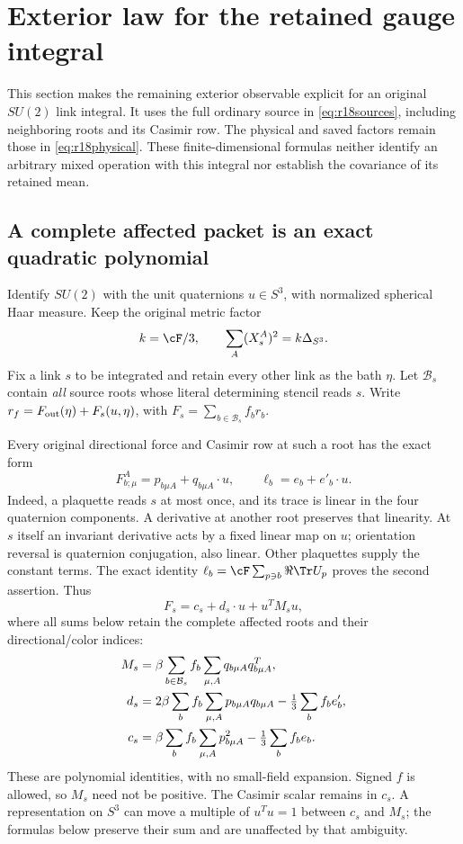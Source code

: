 \section{Exterior law for the retained gauge integral}
\label{bp:section}

This section makes the remaining exterior observable explicit for an original $SU(2)$ link integral. It uses the full ordinary source in \eqref{eq:r18sources}, including neighboring roots and its Casimir row. The physical and saved factors remain those in \eqref{eq:r18physical}. These finite-dimensional formulas neither identify an arbitrary mixed operation with this integral nor establish the covariance of its retained mean.

\subsection{A complete affected packet is an exact quadratic polynomial}

Identify $SU(2)$ with the unit quaternions $u\in S^3$, with normalized spherical Haar measure. Keep the original metric factor
\[
 k=\cF/3,\qquad \sum_A(X_s^A)^2=k\Delta_{S^3}.
\]
Fix a link $s$ to be integrated and retain every other link as the bath $\eta$. Let $\mathcal B_s$ contain \emph{all} source roots whose literal determining stencil reads $s$. Write
$r_f=F_{\rm out}(\eta)+F_s(u,\eta)$, with $F_s=\sum_{b\in\mathcal B_s}f_br_b$.

Every original directional force and Casimir row at such a root has the exact form
\begin{equation}
 F_{b;\mu}^A=p_{b\mu A}+q_{b\mu A}\cdot u,
 \qquad \ell_b=e_b+e'_b\cdot u.
 \label{bp:affineforces}
\end{equation}
Indeed, a plaquette reads $s$ at most once, and its trace is linear in the four quaternion components. A derivative at another root preserves that linearity. At $s$ itself an invariant derivative acts by a fixed linear map on $u$; orientation reversal is quaternion conjugation, also linear. Other plaquettes supply the constant terms. The exact identity $\ell_b=\cF\sum_{p\ni b}\Re\Tr U_p$ proves the second assertion. Thus
\begin{equation}
 F_s=c_s+d_s\cdot u+u^TM_su,
 \label{bp:quadratic}
\end{equation}
where all sums below retain the complete affected roots and their directional/color indices:
\begin{align}
 M_s&=\beta\sum_{b\in\mathcal B_s}f_b\sum_{\mu,A}q_{b\mu A}q_{b\mu A}^T,\notag\\
 d_s&=2\beta\sum_bf_b\sum_{\mu,A}p_{b\mu A}q_{b\mu A}
             -\tfrac13\sum_bf_be'_b,\notag\\
 c_s&=\beta\sum_bf_b\sum_{\mu,A}p_{b\mu A}^2
             -\tfrac13\sum_bf_be_b.
 \label{bp:coefficients}
\end{align}
These are polynomial identities, with no small-field expansion. Signed $f$ is allowed, so $M_s$ need not be positive. The Casimir scalar remains in $c_s$. A representation on $S^3$ can move a multiple of $u^Tu=1$ between $c_s$ and $M_s$; the formulas below preserve their sum and are unaffected by that ambiguity.

